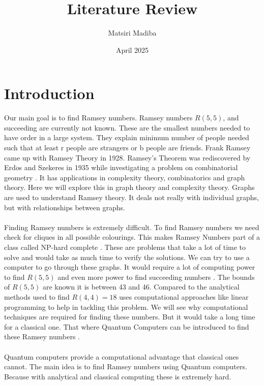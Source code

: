 \documentclass[15pt, a4paper]{Assignment}
\author{Matsiri Madiba}
\date{April 2025}
\title{Literature Review}
\begin{document}
\maketitle

\section*{Introduction}

Our main goal is to find Ramsey numbers.
Ramsey numbers $R(5,5)$, and succeeding are currently not known.
These are the smallest numbers needed to have order in a large system.
They explain minimum number of people needed such that at least r people are strangers or b people are friends.
 Frank Ramsey came up with Ramsey Theory in 1928.
Ramsey's Theorem was rediscovered by Erd$\ddot{o}$s and Szekeres in 1935 while investigating a problem on combinatorial geometry \cite{BondyMurty2008}.									
It has applications in complexity theory, combinatorics and graph theory. 
Here we will explore this in graph theory and complexity theory.
Graphs are used to understand Ramsey theory.
It deals not really with individual graphs, but with relationships between graphs.\cite{burr1981generalized}
\\\\
Finding Ramsey numbers is extremely difficult.
To find Ramsey numbers we need check for cliques in all possible colourings.
This makes Ramsey Numbers part of a class called NP-hard complete  \cite{burr1981generalized}. 
These are problems that take a lot of time to solve and would take as much time to verify the solutions. 
We can try to use a computer to go through these graphs.
It would require a lot of computing power to find $R(5,5)$ and even more power to find succeeding numbers \cite{spencer1994}.
The bounds of $R(5,5)$ are known it is between 43\cite{Exoo1993} and 46\cite{angeltveit2024r55le46}.
Compared to the analytical methods used to find $R(4,4)=18$\cite{GreenwoodGleason1955} uses computational approaches like linear programming to help in tackling this problem.
We will see why computational techniques are required for finding these numbers.
But it would take a long time for a classical one.
That where Quantum Computers can be introduced to find these Ramsey numbers \cite{PhysRevA.93.032301}.
\\\\
Quantum computers provide a computational advantage that classical ones cannot.
The main idea is to find Ramsey numbers using Quantum computers.
Because with analytical and classical computing these is extremely hard.
\end{document}
